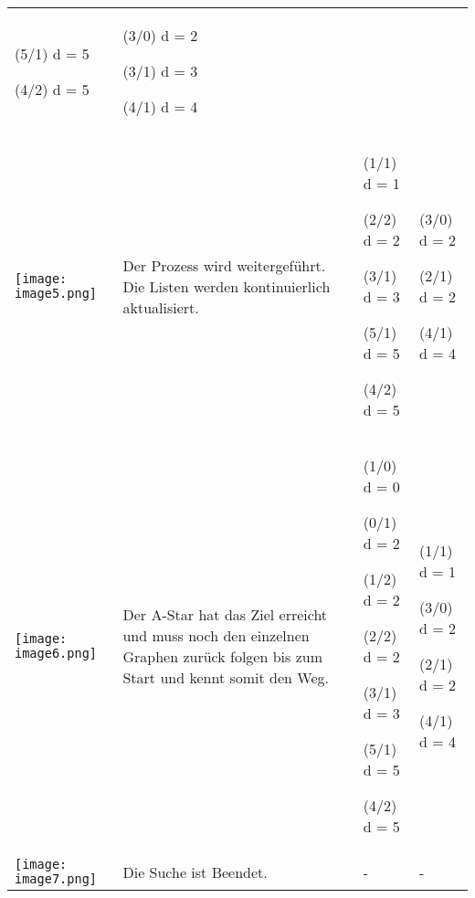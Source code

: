 \begin{longtable}[]{@{}llll@{}}
\begin{minipage}[t]{0.22\columnwidth}
(5/1) d = 5

(4/2) d = 5\strut
\end{minipage} & \begin{minipage}[t]{0.22\columnwidth}\raggedright
(3/0) d = 2

(3/1) d = 3

(4/1) d = 4\strut
\end{minipage}\tabularnewline
\begin{minipage}[t]{0.22\columnwidth}\raggedright
\texttt{[image: image5.png]}\strut
\end{minipage} & \begin{minipage}[t]{0.22\columnwidth}\raggedright
Der Prozess wird weitergeführt. Die Listen werden kontinuierlich
aktualisiert.\strut
\end{minipage} & \begin{minipage}[t]{0.22\columnwidth}\raggedright
(1/1) d = 1

(2/2) d = 2

(3/1) d = 3

(5/1) d = 5

(4/2) d = 5\strut
\end{minipage} & \begin{minipage}[t]{0.22\columnwidth}\raggedright
(3/0) d = 2

(2/1) d = 2

(4/1) d = 4\strut
\end{minipage}\tabularnewline
\begin{minipage}[t]{0.22\columnwidth}\raggedright
\texttt{[image: image6.png]}\strut
\end{minipage} & \begin{minipage}[t]{0.22\columnwidth}\raggedright
Der A-Star hat das Ziel erreicht und muss noch den einzelnen Graphen
zurück folgen bis zum Start und kennt somit den Weg.\strut
\end{minipage} & \begin{minipage}[t]{0.22\columnwidth}\raggedright
(1/0) d = 0

(0/1) d = 2

(1/2) d = 2

(2/2) d = 2

(3/1) d = 3

(5/1) d = 5

(4/2) d = 5\strut
\end{minipage} & \begin{minipage}[t]{0.22\columnwidth}\raggedright
(1/1) d = 1

(3/0) d = 2

(2/1) d = 2

(4/1) d = 4\strut
\end{minipage}\tabularnewline
\texttt{[image: image7.png]} &
Die Suche ist Beendet. & - & -\tabularnewline
\bottomrule
\end{longtable}
